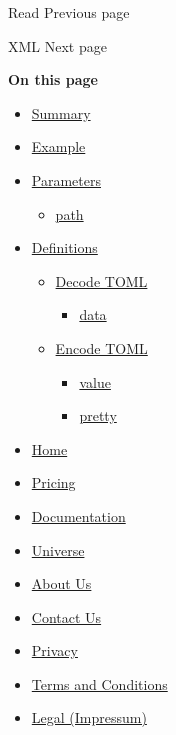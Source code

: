 \href{/docs/reference/data-loading/read/}{\pandocbounded{}}

{ Read } { Previous page }

\href{/docs/reference/data-loading/xml/}{\pandocbounded{}}

{ XML } { Next page }

\textbf{On this page}

\begin{itemize}
\tightlist
\item
  \hyperref[summary]{Summary}
\item
  \hyperref[example]{Example}
\item
  \hyperref[parameters]{Parameters}

  \begin{itemize}
  \tightlist
  \item
    \hyperref[parameters-path]{path}
  \end{itemize}
\item
  \hyperref[definitions]{Definitions}

  \begin{itemize}
  \tightlist
  \item
    \hyperref[definitions-decode]{Decode TOML}

    \begin{itemize}
    \tightlist
    \item
      \hyperref[definitions-decode-data]{data}
    \end{itemize}
  \item
    \hyperref[definitions-encode]{Encode TOML}

    \begin{itemize}
    \tightlist
    \item
      \hyperref[definitions-encode-value]{value}
    \item
      \hyperref[definitions-encode-pretty]{pretty}
    \end{itemize}
  \end{itemize}
\end{itemize}

\begin{itemize}
\tightlist
\item
  \href{/}{Home}
\item
  \href{/pricing/}{Pricing}
\item
  \href{/docs/}{Documentation}
\item
  \href{/universe/}{Universe}
\item
  \href{/about/}{About Us}
\item
  \href{/contact/}{Contact Us}
\item
  \href{/privacy/}{Privacy}
\item
  \href{https://typst.app/terms}{Terms and Conditions}
\item
  \href{/legal/}{Legal (Impressum)}
\end{itemize}

